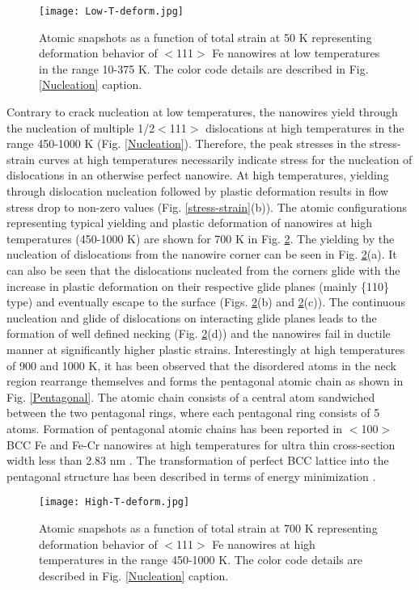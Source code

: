 \documentclass[%
reprint,%
 amssymb, amsmath,%
 aip,apl,%
]{revtex4-1}
\begin{document}
\begin{figure}
\centering
\texttt{[image: Low-T-deform.jpg]}
\caption { Atomic snapshots as a function of total strain at 50 K representing deformation behavior of $<$111$>$ Fe 
nanowires at low temperatures in the range 10-375 K. The color code details are described in Fig. \ref{Nucleation} caption.}
\label{Low-T-deform}
\end{figure}

Contrary to crack nucleation at low temperatures, the nanowires yield through the nucleation of multiple 1/2$<$111$>$ dislocations 
at high temperatures in the range 450-1000 K (Fig. \ref{Nucleation}). Therefore, the peak stresses in the stress-strain curves at 
high temperatures necessarily indicate stress for the nucleation of dislocations in an otherwise perfect nanowire. At high 
temperatures, yielding through dislocation nucleation followed by plastic deformation results in flow stress drop to non-zero 
values (Fig. \ref{stress-strain}(b)). The atomic configurations representing typical yielding and plastic deformation of nanowires 
at high temperatures (450-1000 K) are shown for 700 K in Fig. \ref{High-T-deform}. The yielding by the nucleation of dislocations 
from the nanowire corner can be seen in Fig. \ref{High-T-deform}(a). It can also be seen that the dislocations nucleated from the 
corners glide with the increase in plastic deformation on their respective glide planes (mainly \{110\} type) and eventually escape 
to the surface (Figs. \ref{High-T-deform}(b) and \ref{High-T-deform}(c)). The continuous nucleation and glide of dislocations on 
interacting glide planes leads to the formation of well defined necking (Fig. \ref{High-T-deform}(d)) and the nanowires fail in 
ductile manner at significantly higher plastic strains. Interestingly at high temperatures of 900 and 1000 K, it has been observed 
that the disordered atoms in the neck region rearrange themselves and forms the pentagonal atomic chain as shown in Fig. \ref{Pentagonal}. 
The atomic chain consists of a central atom sandwiched between the two pentagonal rings, where each pentagonal ring consists of 5
atoms. Formation of pentagonal atomic chains has been reported in $<$100$>$ BCC Fe and Fe-Cr nanowires at high temperatures for ultra 
thin cross-section width less than 2.83 nm \cite{Alloy-NWs,Sai-MRX}. The transformation of perfect BCC lattice into the pentagonal 
structure has been described in terms of energy minimization \cite{Sai-MRX,Pentagonal-PRL}.

\begin{figure}
\centering
\texttt{[image: High-T-deform.jpg]}
\caption { Atomic snapshots as a function of total strain at 700 K representing deformation behavior of $<$111$>$ Fe
nanowires at high temperatures in the range 450-1000 K. The color code details are described in Fig. \ref{Nucleation} caption.}
\label{High-T-deform}
\end{figure}
\end{document}
